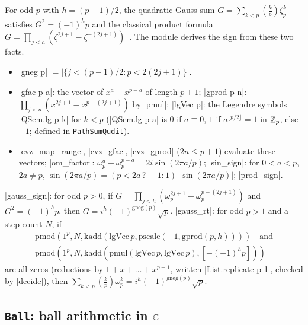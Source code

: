 For odd $p$ with $h=(p-1)/2$, the quadratic Gauss sum $G=\sum_{k<p}\left(\frac kp\right)\zeta_p^k$
satisfies $G^2=(-1)^hp$ and the classical product formula
$G=\prod_{j<h}(\zeta^{2j+1}-\zeta^{-(2j+1)})$~\cite{berndt1998gauss,landsberg1893gauss}. The module
derives the sign from these two facts.
\begin{itemize}
\item \lean|gneg p| $=|\{j<(p-1)/2:p<2(2j+1)\}|$.
\item \lean|gfac p a|: the vector of $x^a-x^{p-a}$ of length $p+1$; \lean|gprod p n|:
  $\prod_{j<n}(x^{2j+1}-x^{p-(2j+1)})$ by \lean|pmul|; \lean|lgVec p|: the Legendre symbols
  \lean|QSem.lg p k| for $k<p$ (\lean|QSem.lg p a| is $0$ if $a\equiv0$, $1$ if $a^{\lfloor p/2\rfloor}=1$ in
  $\mathbb{Z}_{p}$, else $-1$; defined in \texttt{PathSumQudit}).
\item \lean|cvz_map_range|, \lean|cvz_gfac|, \lean|cvz_gprod| ($2n\le p+1$) evaluate these vectors;
  \lean|om_factor|: $\omega_p^a-\omega_p^{p-a}=2i\sin(2\pi a/p)$; \lean|sin_sign|: for $0<a<p$,
  $2a\ne p$, $\sin(2\pi a/p)=(p<2a\,?\,-1:1)\,|\sin(2\pi a/p)|$; \lean|prod_sign|.
\end{itemize}
\begin{theorem}
\lean|gauss_sign|: for odd $p>0$, if $G=\prod_{j<h}(\omega_p^{2j+1}-\omega_p^{p-(2j+1)})$ and
$G^2=(-1)^hp$, then $G=i^h(-1)^{\mathrm{gneg}(p)}\sqrt p$. \lean|gauss_rt|: for odd $p>1$ and a step
count $N$, if
\[\begin{gathered}\mathrm{pmod}(1^p,N,\mathrm{kadd}(\mathrm{lgVec}\,p,\mathrm{pscale}(-1,\mathrm{gprod}(p,h))))\quad\text{and}\\
\mathrm{pmod}(1^p,N,\mathrm{kadd}(\mathrm{pmul}(\mathrm{lgVec}\,p,\mathrm{lgVec}\,p),[-(-1)^hp]))\end{gathered}\]
are all zeros (reductions by $1+x+\dots+x^{p-1}$, written \lean|List.replicate p 1|, checked by
\lean|decide|), then $\sum_{k<p}\left(\frac kp\right)\omega_p^k=i^h(-1)^{\mathrm{gneg}(p)}\sqrt p$.
\end{theorem}

\subsection{\texttt{Ball}: ball arithmetic in \texorpdfstring{$\mathbb{C}$}{C}}


